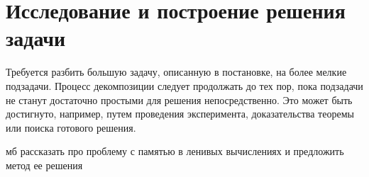 \section{Исследование и построение решения задачи}
\label{sec:Chapter3} 

Требуется разбить большую задачу, описанную в постановке, на более мелкие
подзадачи. Процесс декомпозиции следует продолжать до тех пор, пока подзадачи
не станут достаточно простыми для решения непосредственно. Это может быть
достигнуто, например, путем проведения эксперимента, доказательства теоремы
или поиска готового решения.


мб рассказать про проблему с памятью в ленивых вычислениях и предложить метод ее решения
\newpage
